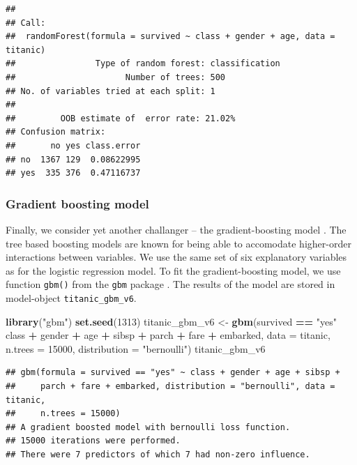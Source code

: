 \documentclass[12pt,]{krantz}
\newenvironment{Shaded}{\begin{snugshade}}{\end{snugshade}}
\newcommand{\DataTypeTok}[1]{\textcolor[rgb]{0.13,0.29,0.53}{#1}}
\newcommand{\DecValTok}[1]{\textcolor[rgb]{0.00,0.00,0.81}{#1}}
\newcommand{\KeywordTok}[1]{\textcolor[rgb]{0.13,0.29,0.53}{\textbf{#1}}}
\newcommand{\NormalTok}[1]{#1}
\newcommand{\OperatorTok}[1]{\textcolor[rgb]{0.81,0.36,0.00}{\textbf{#1}}}
\newcommand{\StringTok}[1]{\textcolor[rgb]{0.31,0.60,0.02}{#1}}
\begin{document}
\begin{verbatim}
## 
## Call:
##  randomForest(formula = survived ~ class + gender + age, data = titanic) 
##                Type of random forest: classification
##                      Number of trees: 500
## No. of variables tried at each split: 1
## 
##         OOB estimate of  error rate: 21.02%
## Confusion matrix:
##       no yes class.error
## no  1367 129  0.08622995
## yes  335 376  0.47116737
\end{verbatim}

\hypertarget{model-titanic-gbm}{%
\subsubsection{Gradient boosting model}\label{model-titanic-gbm}}

Finally, we consider yet another challanger -- the gradient-boosting model \citep{Friedman00greedyfunction}. The tree based boosting models are known for being able to accomodate higher-order interactions between variables. We use the same set of six explanatory variables as for the logistic regression model. To fit the gradient-boosting model, we use function \texttt{gbm()} from the \texttt{gbm} package \citep{gbm}. The results of the model are stored in model-object \texttt{titanic\_gbm\_v6}.

\begin{Shaded}
\begin{Highlighting}[]
\KeywordTok{library}\NormalTok{(}\StringTok{"gbm"}\NormalTok{)}
\KeywordTok{set.seed}\NormalTok{(}\DecValTok{1313}\NormalTok{)}
\NormalTok{titanic_gbm_v6 <-}\StringTok{ }\KeywordTok{gbm}\NormalTok{(survived }\OperatorTok{==}\StringTok{ "yes"} \OperatorTok{~}\StringTok{ }\NormalTok{class }\OperatorTok{+}\StringTok{ }\NormalTok{gender }\OperatorTok{+}\StringTok{ }\NormalTok{age }\OperatorTok{+}\StringTok{ }\NormalTok{sibsp }\OperatorTok{+}\StringTok{ }\NormalTok{parch }\OperatorTok{+}\StringTok{ }\NormalTok{fare }\OperatorTok{+}\StringTok{ }\NormalTok{embarked, }
                      \DataTypeTok{data =}\NormalTok{ titanic, }\DataTypeTok{n.trees =} \DecValTok{15000}\NormalTok{, }\DataTypeTok{distribution =} \StringTok{"bernoulli"}\NormalTok{)}
\NormalTok{titanic_gbm_v6}
\end{Highlighting}
\end{Shaded}

\begin{verbatim}
## gbm(formula = survived == "yes" ~ class + gender + age + sibsp + 
##     parch + fare + embarked, distribution = "bernoulli", data = titanic, 
##     n.trees = 15000)
## A gradient boosted model with bernoulli loss function.
## 15000 iterations were performed.
## There were 7 predictors of which 7 had non-zero influence.
\end{verbatim}
\end{document}
